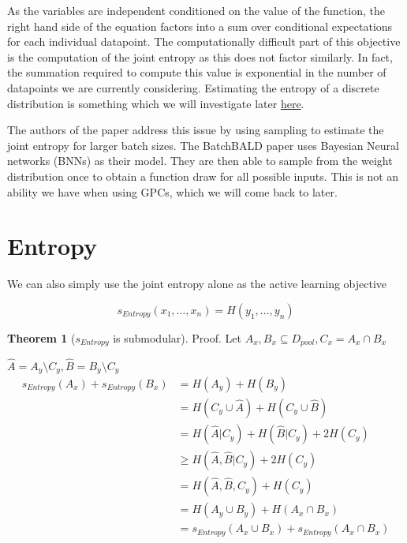 \documentclass[12pt, a4paper]{report}
\theoremstyle{definition}
\newtheorem{theorem}{Theorem}
\begin{document}
As the variables are independent conditioned on the value of the function, the right hand side of the equation factors into a sum over conditional expectations for each individual datapoint. The computationally difficult part of this objective is the computation of the joint entropy as this does not factor similarly. In fact, the summation required to compute this value is exponential in the number of datapoints we are currently considering. Estimating the entropy of a discrete distribution is something which we will investigate later \hyperref[sec:Entropy]{here}.


The authors of the paper address this issue by using sampling to estimate the joint entropy for larger batch sizes. The BatchBALD paper uses Bayesian Neural networks (BNNs) as their model. They are then able to sample from the weight distribution once to obtain a function draw for all possible inputs. This is not an ability we have when using GPCs, which we will come back to later.


\section{Entropy}

We can also simply use the joint entropy alone as the active learning objective

$$s_{Entropy} (x_1, \ldots, x_n) = H(y_1, \ldots, y_n)$$

\begin{theorem}[$s_{Entropy}$ is submodular]
    Proof.
    Let $A_x,B_x \subseteq D_{pool}, C_x = A_x \cap B_x$
    
    $\hat{A} = A_y \setminus C_y, \hat{B} = B_y \setminus C_y$
    \begin{align*}
        s_{Entropy} (A_x) + s_{Entropy} (B_x) &= H(A_y) + H(B_y)\\
        &= H(C_y \cup \hat{A}) + H(C_y \cup \hat{B})\\
        &= H(\hat{A} | C_y) + H(\hat{B} | C_y) + 2 H(C_y)\\
        &\geq H(\hat{A}, \hat{B} | C_y) + 2 H(C_y)\\
        &= H(\hat{A}, \hat{B}, C_y) + H(C_y)\\
        &= H(A_y \cup B_y) + H(A_x \cap B_x)\\
        &= s_{Entropy} (A_x \cup B_x) + s_{Entropy} (A_x \cap B_x)
    \end{align*}

\end{theorem}
\end{document}
